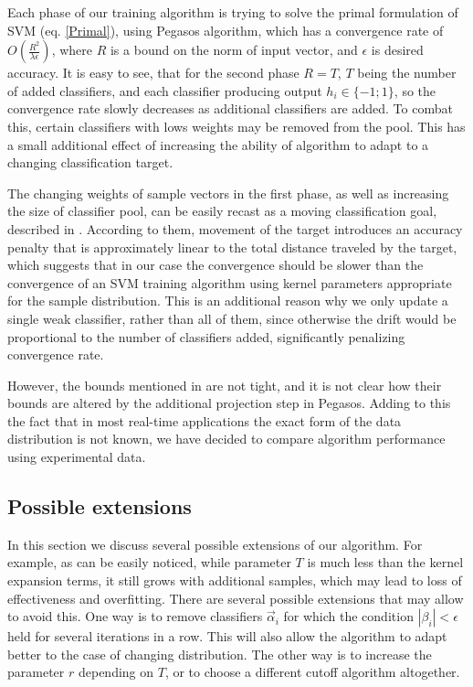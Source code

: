 \documentclass[10pt,twocolumn, a4paper]{article}
\begin{document}
Each phase of our training algorithm is trying to solve the primal formulation of SVM (eq. \ref{Primal}), using Pegasos algorithm, which has a convergence rate of $O\left( \frac{R^2}{\lambda\epsilon}\right)$, where $R$ is a bound on the norm of input vector, and $\epsilon$ is desired accuracy. It is easy to see, that for the second phase $R=T$, $T$ being the number of added classifiers, and each classifier producing output $h_i\in\{-1;1\}$, so the convergence rate slowly decreases as additional classifiers are added. To combat this, certain classifiers with lows weights may be removed from the pool. This has a small additional effect of increasing the ability of algorithm to adapt to a changing classification target. 

The changing weights of sample vectors in the first phase, as well as increasing the size of classifier pool, can be easily recast as a moving classification goal, described in \cite{Norma}. According to them, movement of the target introduces an accuracy penalty that is approximately linear to the total distance traveled by the target, which suggests that in our case the convergence should be slower than the convergence of an SVM training algorithm using kernel parameters appropriate for the sample distribution. This is an additional reason why we only update a single weak classifier, rather than all of them, since otherwise the drift would be proportional to the number of classifiers added, significantly penalizing convergence rate. 

However, the bounds mentioned in \cite{Norma} are not tight, and it is not clear how their bounds are altered by the additional projection step in Pegasos. Adding to this the fact that in most real-time applications the exact form of the data distribution is not known, we have decided to compare algorithm performance using experimental data.

\subsection {Possible extensions}

In this section we discuss several possible extensions of our algorithm. 
For example, as can be easily noticed, while parameter $T$ is much less than the kernel expansion terms, it still grows with additional samples, which may lead to loss of effectiveness and overfitting. There are several possible extensions that may allow to avoid this. One way is to remove classifiers $\vec{\alpha}_i$ for which the condition $|\beta_i|<\epsilon$ held for several iterations in a row. This will also allow the algorithm to adapt better to the case of changing distribution. The other way is to increase the parameter $r$ depending on $T$, or to choose a different cutoff algorithm altogether. 
\end{document}
